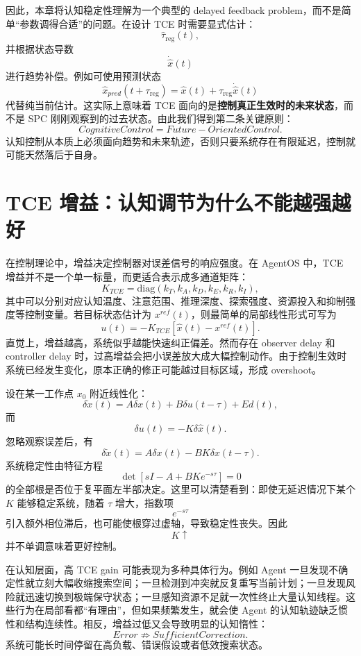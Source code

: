 因此，本章将认知稳定性理解为一个典型的 delayed feedback problem，而不是简单“参数调得合适”的问题。在设计 TCE 时需要显式估计：
\[
\hat{\tau}_{\mathrm{reg}}(t),
\]
并根据状态导数
\[
\dot{\hat{x}}(t)
\]
进行趋势补偿。例如可使用预测状态
\[
\hat{x}_{pred}(t+\tau_{\mathrm{reg}})
=
\hat{x}(t)
+
\tau_{\mathrm{reg}}
\dot{\hat{x}}(t)
\]
代替纯当前估计。这实际上意味着 TCE 面向的是\textbf{控制真正生效时的未来状态}，而不是 SPC 刚刚观察到的过去状态。由此我们得到第二条关键原则：
\[
\boxed{
CognitiveControl
=
Future-OrientedControl.
}
\]
认知控制从本质上必须面向趋势和未来轨迹，否则只要系统存在有限延迟，控制就可能天然落后于自身。

\section{TCE 增益：认知调节为什么不能越强越好}

在控制理论中，增益决定控制器对误差信号的响应强度。在 AgentOS 中，TCE 增益并不是一个单一标量，而更适合表示成多通道矩阵：
\[
K_{TCE}
=
\mathrm{diag}
\left(
k_T,
k_A,
k_D,
k_E,
k_R,
k_I
\right),
\]
其中可以分别对应认知温度、注意范围、推理深度、探索强度、资源投入和抑制强度等控制变量。若目标状态估计为 $x^{ref}(t)$，则最简单的局部线性形式可写为
\[
u(t)
=
-K_{TCE}
\left[
\hat{x}(t)-x^{ref}(t)
\right].
\]
直觉上，增益越高，系统似乎越能快速纠正偏差。然而存在 observer delay 和 controller delay 时，过高增益会把小误差放大成大幅控制动作。由于控制生效时系统已经发生变化，原本正确的修正可能越过目标区域，形成 overshoot。

设在某一工作点 $x_0$ 附近线性化：
\[
\delta\dot{x}(t)
=
A\delta x(t)
+
B\delta u(t-\tau)
+
E d(t),
\]
而
\[
\delta u(t)
=
-K\delta\hat{x}(t).
\]
忽略观察误差后，有
\[
\delta\dot{x}(t)
=
A\delta x(t)
-
BK\delta x(t-\tau).
\]
系统稳定性由特征方程
\[
\det
\left[
sI-A+BK e^{-s\tau}
\right]
=
0
\]
的全部根是否位于复平面左半部决定。这里可以清楚看到：即使无延迟情况下某个 $K$ 能够稳定系统，随着 $\tau$ 增大，指数项
\[
e^{-s\tau}
\]
引入额外相位滞后，也可能使根穿过虚轴，导致稳定性丧失。因此
\[
K\uparrow
\]
并不单调意味着更好控制。

在认知层面，高 TCE gain 可能表现为多种具体行为。例如 Agent 一旦发现不确定性就立刻大幅收缩搜索空间；一旦检测到冲突就反复重写当前计划；一旦发现风险就迅速切换到极端保守状态；一旦感知资源不足就一次性终止大量认知线程。这些行为在局部看都“有理由”，但如果频繁发生，就会使 Agent 的认知轨迹缺乏惯性和结构连续性。相反，增益过低又会导致明显的认知惰性：
\[
Error
\not\Rightarrow
SufficientCorrection.
\]
系统可能长时间停留在高负载、错误假设或者低效搜索状态。

